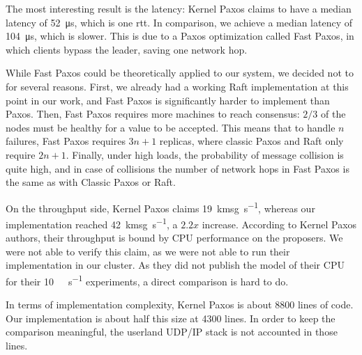 The most interesting result is the latency: Kernel Paxos claims to have a median latency of \SI{52}{\micro\second}, which is one \gls{rtt}.
In comparison, we achieve a median latency of \SI{104}{\micro\second}, which is slower.  %
This is due to a Paxos optimization called Fast Paxos\cite{lamport2006fast}, in which clients bypass the leader, saving one network hop.

While Fast Paxos could be theoretically applied to our system, we decided not to for several reasons.
First, we already had a working Raft implementation at this point in our work, and Fast Paxos is significantly harder to implement than Paxos.
Then, Fast Paxos requires more machines to reach consensus: $2/3$ of the nodes must be healthy for a value to be accepted.
This means that to handle $n$ failures, Fast Paxos requires $3n + 1$ replicas, where classic Paxos and Raft only require $2n + 1$.
Finally, under high loads, the probability of message collision is quite high, and in case of collisions the number of network hops in Fast Paxos is the same as with Classic Paxos or Raft.

On the throughput side, Kernel Paxos claims \SI{19}{\kilo msg\per\second}, whereas our implementation reached \SI{42}{\kilo msg\per\second}, a $2.2x$ increase. %
According to Kernel Paxos authors, their throughput is bound by CPU performance on the proposers.
We were not able to verify this claim, as we were not able to run their implementation in our cluster.
As they did not publish the model of their CPU for their \SI{10}{\giga\bit\per\second} experiments, a direct comparison is hard to do.

In terms of implementation complexity, Kernel Paxos is about 8800 lines of code.
Our implementation is about half this size at 4300 lines.
In order to keep the comparison meaningful, the userland UDP/IP stack is not accounted in those lines.
